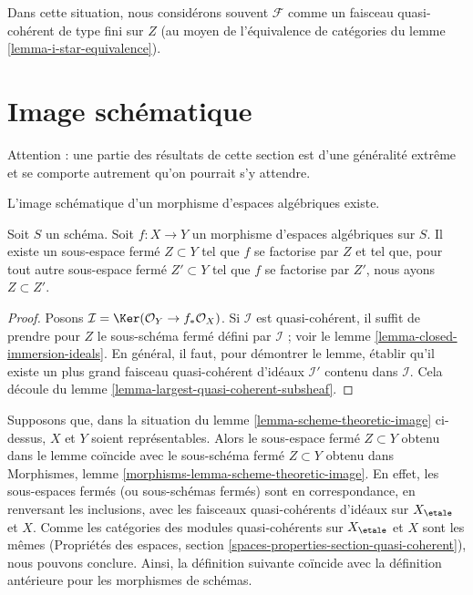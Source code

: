 \noindent
Dans cette situation, nous considérons souvent $\mathcal{F}$ comme un faisceau
quasi-cohérent de type fini sur $Z$ (au moyen de l'équivalence de catégories du
lemme \ref{lemma-i-star-equivalence}).






\section{Image schématique}
\label{section-scheme-theoretic-image}

\noindent
Attention : une partie des résultats de cette section est d'une généralité extrême
et se comporte autrement qu'on pourrait s'y attendre.

\begin{lemma}
\label{lemma-scheme-theoretic-image}
\begin{slogan}
L'image schématique d'un morphisme d'espaces algébriques existe.
\end{slogan}
Soit $S$ un schéma. Soit $f : X \to Y$ un morphisme d'espaces algébriques
sur $S$. Il existe un sous-espace fermé $Z \subset Y$ tel que $f$ se factorise
par $Z$ et tel que, pour tout autre sous-espace fermé $Z' \subset Y$ tel que
$f$ se factorise par $Z'$, nous ayons $Z \subset Z'$.
\end{lemma}

\begin{proof}
Posons $\mathcal{I} = \Ker(\mathcal{O}_Y \to f_*\mathcal{O}_X)$.
Si $\mathcal{I}$ est quasi-cohérent, il suffit de prendre pour $Z$ le
sous-schéma fermé défini par $\mathcal{I}$ ; voir
le lemme \ref{lemma-closed-immersion-ideals}.
En général, il faut, pour démontrer le lemme, établir qu'il existe
un plus grand faisceau quasi-cohérent d'idéaux $\mathcal{I}'$ contenu dans
$\mathcal{I}$.
Cela découle du lemme \ref{lemma-largest-quasi-coherent-subsheaf}.
\end{proof}

\noindent
Supposons que, dans la situation du lemme \ref{lemma-scheme-theoretic-image}
ci-dessus, $X$ et $Y$ soient représentables. Alors le sous-espace fermé $Z \subset Y$
obtenu dans le lemme coïncide avec le sous-schéma fermé $Z \subset Y$ obtenu dans
Morphismes, lemme \ref{morphisms-lemma-scheme-theoretic-image}.
En effet, les sous-espaces fermés (ou sous-schémas fermés) sont en correspondance,
en renversant les inclusions, avec les faisceaux quasi-cohérents d'idéaux sur
$X_\etale$ et $X$. Comme les catégories des modules quasi-cohérents
sur $X_\etale$ et $X$ sont les mêmes
(Propriétés des espaces, section \ref{spaces-properties-section-quasi-coherent}),
nous pouvons conclure. Ainsi, la définition suivante coïncide avec la définition
antérieure pour les morphismes de schémas.

